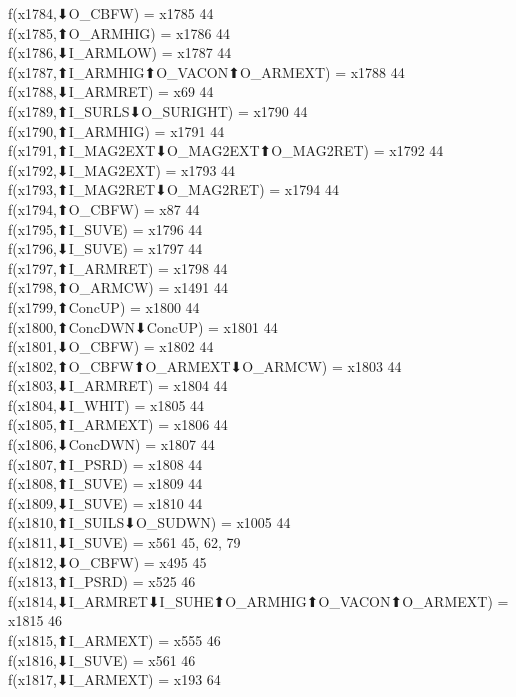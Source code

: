 f(x1784,⬇O_CBFW) = x1785 {44} \\
f(x1785,⬆O_ARMHIG) = x1786 {44} \\
f(x1786,⬇I_ARMLOW) = x1787 {44} \\
f(x1787,⬆I_ARMHIG⬆O_VACON⬆O_ARMEXT) = x1788 {44} \\
f(x1788,⬇I_ARMRET) = x69 {44} \\
f(x1789,⬆I_SURLS⬇O_SURIGHT) = x1790 {44} \\
f(x1790,⬆I_ARMHIG) = x1791 {44} \\
f(x1791,⬆I_MAG2EXT⬇O_MAG2EXT⬆O_MAG2RET) = x1792 {44} \\
f(x1792,⬇I_MAG2EXT) = x1793 {44} \\
f(x1793,⬆I_MAG2RET⬇O_MAG2RET) = x1794 {44} \\
f(x1794,⬆O_CBFW) = x87 {44} \\
f(x1795,⬆I_SUVE) = x1796 {44} \\
f(x1796,⬇I_SUVE) = x1797 {44} \\
f(x1797,⬆I_ARMRET) = x1798 {44} \\
f(x1798,⬆O_ARMCW) = x1491 {44} \\
f(x1799,⬆ConcUP) = x1800 {44} \\
f(x1800,⬆ConcDWN⬇ConcUP) = x1801 {44} \\
f(x1801,⬇O_CBFW) = x1802 {44} \\
f(x1802,⬆O_CBFW⬆O_ARMEXT⬇O_ARMCW) = x1803 {44} \\
f(x1803,⬇I_ARMRET) = x1804 {44} \\
f(x1804,⬇I_WHIT) = x1805 {44} \\
f(x1805,⬆I_ARMEXT) = x1806 {44} \\
f(x1806,⬇ConcDWN) = x1807 {44} \\
f(x1807,⬆I_PSRD) = x1808 {44} \\
f(x1808,⬆I_SUVE) = x1809 {44} \\
f(x1809,⬇I_SUVE) = x1810 {44} \\
f(x1810,⬆I_SUILS⬇O_SUDWN) = x1005 {44} \\
f(x1811,⬇I_SUVE) = x561 {45, 62, 79} \\
f(x1812,⬇O_CBFW) = x495 {45} \\
f(x1813,⬆I_PSRD) = x525 {46} \\
f(x1814,⬇I_ARMRET⬇I_SUHE⬆O_ARMHIG⬆O_VACON⬆O_ARMEXT) = x1815 {46} \\
f(x1815,⬆I_ARMEXT) = x555 {46} \\
f(x1816,⬇I_SUVE) = x561 {46} \\
f(x1817,⬇I_ARMEXT) = x193 {64} \\
